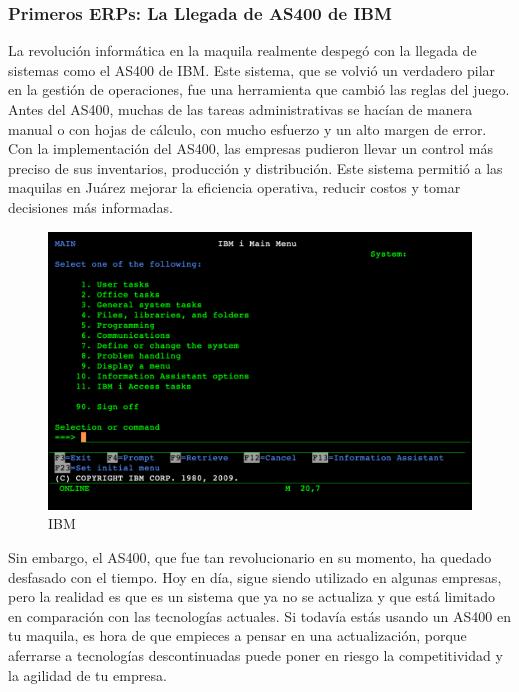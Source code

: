 \documentclass[
  10pt,
  letterpaper,
]{book}
\begin{document}
\subsubsection{Primeros ERPs: La Llegada de AS400 de
IBM}\label{primeros-erps-la-llegada-de-as400-de-ibm}

La revolución informática en la maquila realmente despegó con la llegada
de sistemas como el AS400 de IBM. Este sistema, que se volvió un
verdadero pilar en la gestión de operaciones, fue una herramienta que
cambió las reglas del juego. Antes del AS400, muchas de las tareas
administrativas se hacían de manera manual o con hojas de cálculo, con
mucho esfuerzo y un alto margen de error. Con la implementación del
AS400, las empresas pudieron llevar un control más preciso de sus
inventarios, producción y distribución. Este sistema permitió a las
maquilas en Juárez mejorar la eficiencia operativa, reducir costos y
tomar decisiones más informadas.

\begin{figure}[H]

{\centering \includegraphics{Img/ibm.png}

}

\caption{IBM}

\end{figure}%

Sin embargo, el AS400, que fue tan revolucionario en su momento, ha
quedado desfasado con el tiempo. Hoy en día, sigue siendo utilizado en
algunas empresas, pero la realidad es que es un sistema que ya no se
actualiza y que está limitado en comparación con las tecnologías
actuales. Si todavía estás usando un AS400 en tu maquila, es hora de que
empieces a pensar en una actualización, porque aferrarse a tecnologías
descontinuadas puede poner en riesgo la competitividad y la agilidad de
tu empresa.
\end{document}
